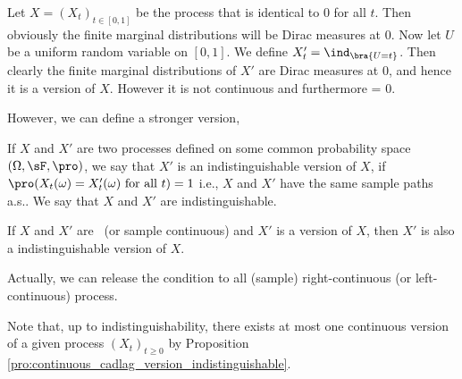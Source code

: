 \begin{example}
Let $X = (X_t)_{t\in [0,1]}$ be the process that is identical to 0 for all $t$. Then obviously the finite marginal distributions will be Dirac measures at 0. Now let $U$ be a uniform random variable on $[0, 1]$. We define $X'_t = \ind_{\bra{U = t}}$. Then clearly the finite marginal distributions of $X'$ are Dirac measures at 0, and hence it is a version of $X$. However it is not continuous and furthermore
\be
\pro{} = 0.
\ee
\end{example}

However, we can define a stronger version,

\begin{definition}\label{def:indistinguishable_version_process}
If $X$ and $X'$ are two processes defined on some common probability space $(\Omega,\sF,\pro)$, we say that $X'$ is an indistinguishable version of $X$, if $\pro(X_t(\omega) = X'_t(\omega) \text{ for all }t) = 1$ i.e., $X$ and $X'$ have the same sample paths a.s.. We say that $X$ and $X'$ are indistinguishable.
\end{definition}

\begin{proposition}\label{pro:continuous_cadlag_version_indistinguishable}
If $X$ and $X'$ are \cadlag\ (or sample continuous) and $X'$ is a version of $X$, then $X'$ is also a indistinguishable version of $X$.
\end{proposition}

\begin{remark}
Actually, we can release the condition to all (sample) right-continuous (or left-continuous) process.

Note that, up to indistinguishability, there exists at most one continuous version of a given process $(X_t)_{t \geq 0}$ by Proposition \ref{pro:continuous_cadlag_version_indistinguishable}.
\end{remark}

